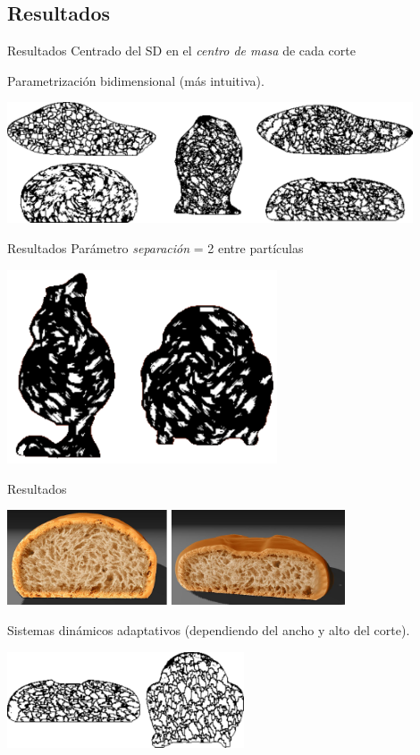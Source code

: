 \documentclass[spanish,unknownkeysallowed]{beamer}
\begin{document}
\subsection{Resultados}

\begin{frame}{Resultados}
Centrado del SD en el {\em centro de masa} de cada corte

Parametrización bidimensional (más intuitiva).

\includegraphics[width=12cm]{../figures/Fig5}
\end{frame}


\begin{frame}{Resultados}
Parámetro {\em separación} = 2 entre partículas

\centerline{\includegraphics[width=8cm]{../figures/Fig7}}
\end{frame}

\begin{frame}{Resultados}
\centerline{\includegraphics[width=10cm]{../figures/Fig11CAVW}}


Sistemas dinámicos adaptativos (dependiendo del ancho y alto del corte).

\centerline{\includegraphics[width=7cm]{../figures/Fig6}}

\end{frame}
\end{document}
